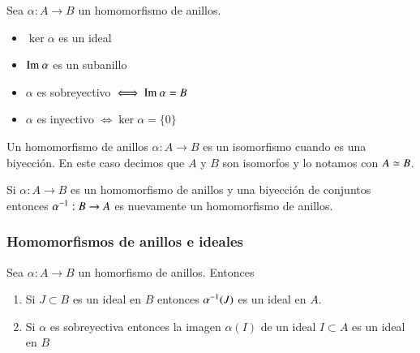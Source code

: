 \begin{thm}
	Sea $\alpha: A \to B$ un homomorfismo de anillos.
	\begin{itemize}
		\item $\ker \alpha$ es un ideal
		\item $\text{Im } \alpha$ es un subanillo
		\item $\alpha$ es sobreyectivo $\iff \text{Im } \alpha = B$
		\item $\alpha$ es inyectivo $\iff \ker \alpha = \{0\}$
	\end{itemize}
\end{thm}

\begin{dfn}
	Un homomorfismo de anillos $\alpha: A \to B$ es un isomorfismo cuando es una biyección. En este caso decimos que $A$ y $B$ son isomorfos y lo notamos con $A \simeq B$.
\end{dfn}

\begin{pro}
	Si $\alpha: A \to B$ es un homomorfismo de anillos y una biyección de conjuntos entonces $\alpha^{-1}:B \to A$ es nuevamente un homomorfismo de anillos.
\end{pro}

\subsubsection{Homomorfismos de anillos e ideales}

\begin{thm}
	Sea $\alpha: A \to B$ un homorfismo de anillos. Entonces
	\begin{enumerate}
		\item Si $J \subset B$ es un ideal en $B$ entonces $\alpha^{-1}(J)$ es un ideal en $A$.
		\item Si $\alpha$ es sobreyectiva entonces la imagen $\alpha(I)$ de un ideal $I \subset A$ es un ideal en $B$
	\end{enumerate}
\end{thm}

